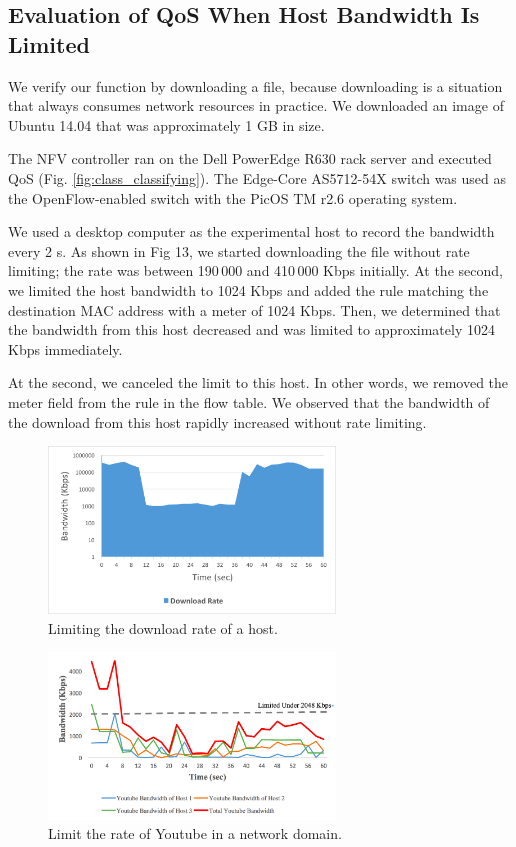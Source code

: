 \documentclass[10pt,journal]{IEEEtran}
\begin{document}
\subsection{Evaluation of QoS When Host Bandwidth Is Limited}

We verify our function by downloading a file, because downloading is a situation that always consumes network resources in practice. We downloaded an image of Ubuntu 14.04 that was approximately 1 GB in size.


The NFV controller ran on the Dell PowerEdge R630 rack server and executed QoS (Fig. \ref{fig:class_classifying}). The Edge-Core AS5712-54X \cite{edge-core-switch} switch was used as the OpenFlow-enabled switch with the PicOS TM r2.6 operating system.

We used a desktop computer as the experimental host to record the bandwidth every 2 s. As shown in Fig 13, we started downloading the file without rate limiting; the rate was between 190 000 and 410 000 Kbps initially. At the  second, we limited the host bandwidth to 1024 Kbps and added the rule matching the destination MAC address with a meter of 1024 Kbps. Then, we determined that the bandwidth from this host decreased and was limited to approximately 1024 Kbps immediately.

At the  second, we canceled the limit to this host. In other words, we removed the meter field from the rule in the flow table. We observed that the bandwidth of the download from this host rapidly increased without rate limiting.

\begin{figure}[!t]
\centering
\includegraphics[width=3in]{./figures/qos_limit_host}
\caption{Limiting the download rate of a host.}
\label{fig:qos_limit_host}
\end{figure}

\begin{figure}[!t]
\centering
\includegraphics[width=3in]{./figures/mft_qos_rate_domain_app}
\caption{Limit the rate of Youtube in a network domain.}
\label{fig:mft_qos_rate_domain_app}
\end{figure}
\end{document}

